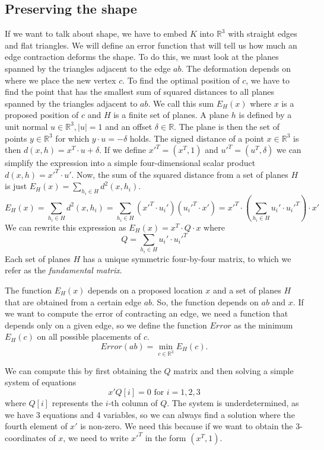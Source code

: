 \documentclass{ijclclp}
\begin{document}
\subsection{Preserving the shape}
If we want to talk about shape, we have to embed $K$ into $\mathbb{R}^3$ with straight edges and flat triangles. We will define an error function that will tell us how much an edge contraction deforms the shape. To do this, we must look at the planes spanned by the triangles adjacent to the edge $ab$. The deformation depends on where we place the new vertex $c$. To find the optimal position of $c$, we have to find the point that has the smallest sum of squared distances to all planes spanned by the triangles adjacent to $ab$. We call this sum $E_H(x)$ where $x$ is a proposed position of $c$ and $H$ is a finite set of planes. A plane $h$ is defined by a unit normal $u \in \mathbb{R}^3, |u|=1$ and an offset $\delta \in \mathbb{R}$. The plane is then the set of points $y \in \mathbb{R}^3$ for which $y \cdot u = -\delta$ holds. The signed distance of a point $x\in \mathbb{R}^3$ is then $d(x,h) = x^T \cdot u + \delta$. If we define $x'^T = (x^T, 1)$ and $u'^T = (u^T, \delta)$ we can simplify the expression into a simple four-dimensional scalar product $d(x,h) = x'^T \cdot u'$. Now, the sum of the squared distance from a set of planes $H$ is just $E_H(x) = \sum_{h_i \in H} d^2(x, h_i)$.
\[E_H(x) = \sum_{h_i \in H} d^2(x, h_i) = \sum_{h_i \in H} (x'^T \cdot u_i')(u_i'^T \cdot x') = x'^T \cdot \left( \sum_{h_i \in H} u_i' \cdot u_i'^T \right) \cdot x'\]
We can rewrite this expression as $E_H(x) = x^T \cdot Q \cdot x$ where \[Q = \sum_{h_i \in H} u_i' \cdot u_i'^T\]
Each set of planes $H$ has a unique symmetric four-by-four matrix, to which we refer as the \textit{fundamental matrix}.

The function $E_H(x)$ depends on a proposed location $x$ and a set of planes $H$ that are obtained from a certain edge $ab$. So, the function depends on $ab$ and $x$. If we want to compute the error of contracting an edge, we need a function that depends only on a given edge, so we define the function $Error$ as the minimum $E_H(c)$ on all possible placements of $c$.
\[Error(ab) = \min_{c \in \mathbb{R}^3}E_H(c).\]

We can compute this by first obtaining the $Q$ matrix and then solving a simple system of equations
\[x'Q[i] = 0 \text{ for } i=1,2,3\]
where $Q[i]$ represents the $i$-th column of $Q$. The system is underdetermined, as we have 3 equations and 4 variables, so we can always find a solution where the fourth element of $x'$ is non-zero. We need this because if we want to obtain the 3-coordinates of $x$, we need to write $x'^T$ in the form $(x^T, 1)$.
\end{document}
